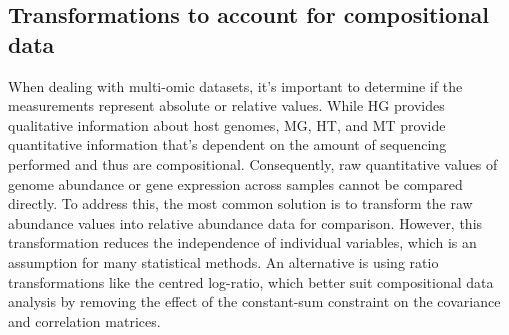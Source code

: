 \documentclass[
]{book}
\newenvironment{Shaded}{\begin{snugshade}}{\end{snugshade}}
\newcommand{\CommentTok}[1]{\textcolor[rgb]{0.56,0.35,0.01}{\textit{#1}}}
\newcommand{\ControlFlowTok}[1]{\textcolor[rgb]{0.13,0.29,0.53}{\textbf{#1}}}
\newcommand{\DecValTok}[1]{\textcolor[rgb]{0.00,0.00,0.81}{#1}}
\newcommand{\FloatTok}[1]{\textcolor[rgb]{0.00,0.00,0.81}{#1}}
\newcommand{\FunctionTok}[1]{\textcolor[rgb]{0.13,0.29,0.53}{\textbf{#1}}}
\newcommand{\NormalTok}[1]{#1}
\newcommand{\OtherTok}[1]{\textcolor[rgb]{0.56,0.35,0.01}{#1}}
\newcommand{\SpecialCharTok}[1]{\textcolor[rgb]{0.81,0.36,0.00}{\textbf{#1}}}
\newcommand{\StringTok}[1]{\textcolor[rgb]{0.31,0.60,0.02}{#1}}
\begin{document}
\begin{Shaded}
\end{Shaded}

\hypertarget{data-transformation-compositional}{%
\subsection{Transformations to account for compositional data}\label{data-transformation-compositional}}

When dealing with multi-omic datasets, it's important to determine if the measurements represent absolute or relative values. While HG provides qualitative information about host genomes, MG, HT, and MT provide quantitative information that's dependent on the amount of sequencing performed and thus are compositional. Consequently, raw quantitative values of genome abundance or gene expression across samples cannot be compared directly. To address this, the most common solution is to transform the raw abundance values into relative abundance data for comparison. However, this transformation reduces the independence of individual variables, which is an assumption for many statistical methods. An alternative is using ratio transformations like the centred log-ratio, which better suit compositional data analysis by removing the effect of the constant-sum constraint on the covariance and correlation matrices.
\end{document}
